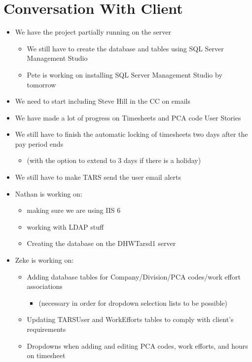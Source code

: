 \documentclass{article}
\begin{document}
\section{Conversation With Client}
\begin{itemize}
\item We have the project partially running on the server
	\begin{itemize}
	\item We still have to create the database and tables using SQL Server Management Studio
	\item Pete is working on installing SQL Server Management Studio by tomorrow
	\end{itemize}
\item We need to start including Steve Hill in the CC on emails
\item We have made a lot of progress on Timesheets and PCA code User Stories
\item We still have to finish the automatic locking of timesheets two days after the pay period ends
	\begin{itemize}
	\item (with the option to extend to 3 days if there is a holiday)
	\end{itemize}
\item We still have to make TARS send the user email alerts

\item Nathan is working on: 
	\begin{itemize}
	\item making sure we are using IIS 6 
	\item working with LDAP stuff
	\item Creating the database on the DHWTarsd1 server
	\end{itemize}
\item Zeke is working on:
	\begin{itemize}
	\item Adding database tables for Company/Division/PCA codes/work effort associations
	\begin{itemize}
		\item (necessary in order for dropdown selection lists to be possible)
	\end{itemize}
	\item Updating TARSUser and WorkEfforts tables to comply with client's requirements
	\item Dropdowns when adding and editing PCA codes, work efforts, and hours on timesheet
	\end{itemize}
\end{itemize}
\end{document}
